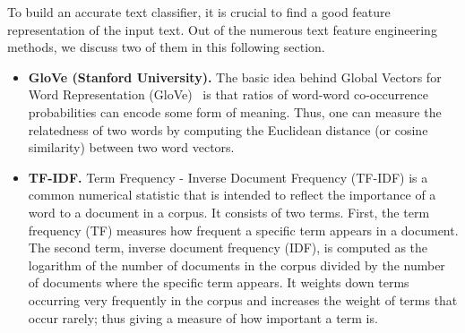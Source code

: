 To build an accurate text classifier, it is crucial to find a good feature representation of the input text. Out of the numerous text feature engineering methods, we discuss two of them in this following section. 
\begin{itemize}
\item \textbf{GloVe (Stanford University).}
The basic idea behind Global Vectors for Word Representation (GloVe)~\cite{pennington2014glove} is that ratios of word-word co-occurrence probabilities can encode some form of meaning. 
Thus, one can measure the relatedness of two words by computing the Euclidean distance (or cosine similarity) between two word vectors.
\iffalse
\subsubsection{FastText (Facebook)}
The FastText technique~\cite{bojanowski2016enriching,joulin2016bag} takes into account the internal  structure  of  words. Each word is represented as a bag of character n-grams. A vector is computed for each n-gram and these vectors are averaged to give a sentence representation.
\fi
\item \textbf{TF-IDF.}
Term Frequency - Inverse Document Frequency (TF-IDF) is a common numerical statistic that is intended to reflect the importance of a word to a document in a corpus.
It consists of two terms.
First, the term frequency (TF) measures how frequent a specific term appears in a document. The second term, inverse document frequency (IDF), is computed as the logarithm of the number of documents in the corpus divided by the number of documents where the specific term appears.
It weights down terms occurring very frequently in the corpus and increases the weight of terms that occur rarely; thus giving a measure of how important a term is.

\iffalse
The second term, inverse document frequency (IDF), is computed as the logarithm of the number of documents in the corpus divided by the number of documents where the specific term appears.
It weights down terms occurring very frequently in the corpus and increases the weight of terms that occur rarely; thus giving a measure of how important a term is.
\fi
\end{itemize}
